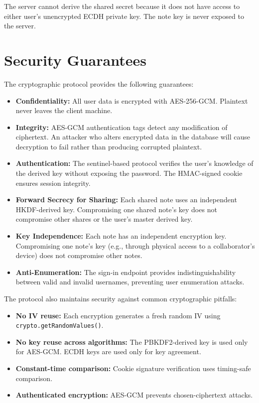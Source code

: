 The server cannot derive the shared secret because it does not have access to either user's unencrypted ECDH private key. The note key is never exposed to the server.

\section{Security Guarantees}

The cryptographic protocol provides the following guarantees:

\begin{itemize}
    \item \textbf{Confidentiality:} All user data is encrypted with AES-256-GCM. Plaintext never leaves the client machine.

    \item \textbf{Integrity:} AES-GCM authentication tags detect any modification of ciphertext. An attacker who alters encrypted data in the database will cause decryption to fail rather than producing corrupted plaintext.

    \item \textbf{Authentication:} The sentinel-based protocol verifies the user's knowledge of the derived key without exposing the password. The HMAC-signed cookie ensures session integrity.

    \item \textbf{Forward Secrecy for Sharing:} Each shared note uses an independent HKDF-derived key. Compromising one shared note's key does not compromise other shares or the user's master derived key.

    \item \textbf{Key Independence:} Each note has an independent encryption key. Compromising one note's key (e.g., through physical access to a collaborator's device) does not compromise other notes.

    \item \textbf{Anti-Enumeration:} The sign-in endpoint provides indistinguishability between valid and invalid usernames, preventing user enumeration attacks.
\end{itemize}

The protocol also maintains security against common cryptographic pitfalls:

\begin{itemize}
    \item \textbf{No IV reuse:} Each encryption generates a fresh random IV using \texttt{crypto.getRandomValues()}.
    \item \textbf{No key reuse across algorithms:} The PBKDF2-derived key is used only for AES-GCM. ECDH keys are used only for key agreement.
    \item \textbf{Constant-time comparison:} Cookie signature verification uses timing-safe comparison.
    \item \textbf{Authenticated encryption:} AES-GCM prevents chosen-ciphertext attacks.
\end{itemize}
